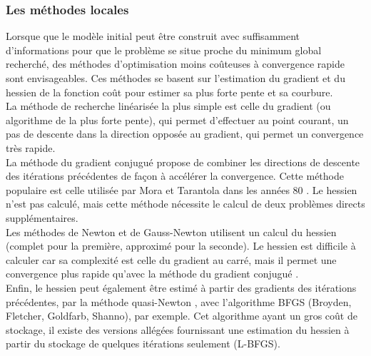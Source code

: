 \subsubsection{Les méthodes locales}
Lorsque que le modèle initial peut être construit avec suffisamment d'informations pour que le problème se situe proche du minimum global recherché, des méthodes d'optimisation moins coûteuses à convergence rapide sont envisageables. Ces méthodes se basent sur l'estimation du gradient et du hessien de la fonction coût pour estimer sa plus forte pente et sa courbure.\\

La méthode de recherche linéarisée la plus simple est celle du gradient (ou algorithme de la plus forte pente), qui permet d'effectuer au point courant, un pas de descente dans la direction opposée au gradient, qui permet un convergence très rapide. \\

La méthode du gradient conjugué propose de combiner les directions de descente des itérations précédentes de façon à accélérer la convergence. Cette méthode populaire est celle utilisée par Mora et Tarantola dans les années 80 \citep{tarantola_84, mora_87a, mora_87b}. Le hessien n'est pas calculé, mais cette méthode nécessite le calcul de deux problèmes directs supplémentaires. \\

Les méthodes de Newton et de Gauss-Newton utilisent un calcul du hessien (complet pour la première, approximé pour la seconde). Le hessien est difficile à calculer car sa complexité est celle du gradient au carré, mais il permet une convergence plus rapide qu'avec la méthode du gradient conjugué \citep{pratt_98}.\\

Enfin, le hessien peut également être estimé à partir des gradients des itérations précédentes, par la méthode quasi-Newton \citep{nocedal}, avec l'algorithme BFGS (Broyden, Fletcher, Goldfarb, Shanno), par exemple. Cet algorithme ayant un gros coût de stockage, il existe des versions allégées fournissant une estimation du hessien à partir du stockage de quelques itérations seulement (L-BFGS). 
